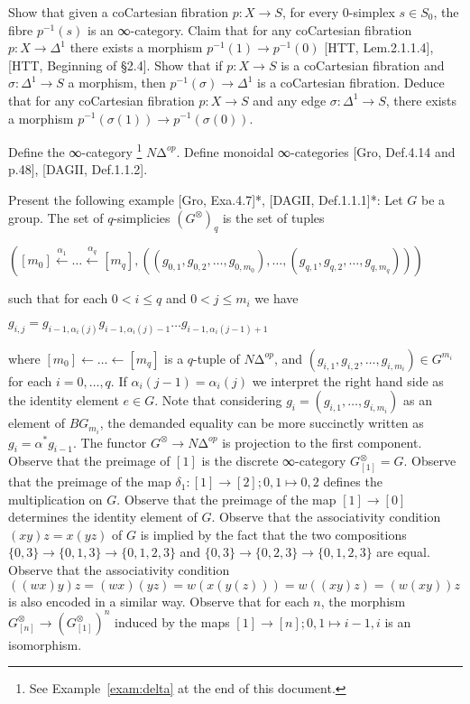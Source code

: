 \documentclass[a4paper]{amsart}
\numberwithin{figure}{section}
\theoremstyle{theorem}
\theoremstyle{definition}
\begin{document}
Show that given a coCartesian fibration $p: X {\to} S$, for every 0-simplex $s \in S_0$, the fibre $p^{-1}(s)$ is an ∞-category. %
Claim that for any coCartesian fibration $p: X {\to} \Delta^1$ there exists a morphism $p^{-1}(1) \to p^{-1}(0)$ [HTT, Lem.2.1.1.4], [HTT, Beginning of §2.4]. %
Show that if $p: X{\to}S$ is a coCartesian fibration and $\sigma: \Delta^1 {\to}S$ a morphism, then $p^{-1}(\sigma) \to \Delta^1$ is a coCartesian fibration. %
Deduce that for any coCartesian fibration $p: X \to S$ and any edge $\sigma: \Delta^1 \to S$, there exists a morphism $p^{-1}(\sigma(1)) \to p^{-1}(\sigma(0))$. %

Define the ∞-category%
\footnote{%
See Example~\ref{exam:delta} at the end of this document.%
} %
 $N∆^{op}$. %
 Define monoidal ∞-categories [Gro, Def.4.14 and p.48], [DAGII, Def.1.1.2]. %

Present the following example [Gro, Exa.4.7]*, [DAGII, Def.1.1.1]*: Let $G$ be a group. 
The set of $q$-simplicies $(G^\otimes)_q$ is the set of tuples 
%
\begin{center}
$([m_0] {\stackrel{\alpha_1}{\leftarrow}} \dots {\stackrel{\alpha_q}{\leftarrow}} [m_q], ((g_{0,1}, g_{0,2}, \dots, g_{0, m_0}), \dots, (g_{q,1}, g_{q,2}, \dots, g_{q, m_q})))$
\end{center}
%
such that for each $0 < i ≤ q$ and $0 < j ≤ m_i$ we have %
\begin{center}
$
g_{i,j} = 
g_{i{-}1,\alpha_i(j)}
g_{i{-}1,\alpha_i(j){-}1}
\dots 
g_{i{-}1,\alpha_i(j{-}1){+}1}$
\end{center} %
where $[m_0] {\leftarrow} \dots {\leftarrow} [m_q]$ is a $q$-tuple of $N∆^{op}$, and $(g_{i,1}, g_{i,2}, \dots, g_{i, m_i}) \in G^{m_i}$ for each $i = 0, \dots, q$. If $\alpha_i(j{-}1) = \alpha_i(j)$ we interpret the right hand side as the identity element $e \in G$. Note that considering $g_i = (g_{i,1}, \dots, g_{i, m_i})$ as an element of $BG_{m_i}$, the demanded equality can be more succinctly written as $g_{i} = \alpha^*g_{i{-}1}$. %
The functor $G^\otimes \to N∆^{op}$ is projection to the first component. %
Observe that the preimage of $[1]$ is the discrete ∞-category $G^\otimes_{[1]} = G$. %
Observe that the preimage of the map $\delta_1: [1] {→} [2]; 0,1 \mapsto 0,2$ defines the multiplication on $G$. %
Observe that the preimage of the map $[1] → [0]$ determines the identity element of $G$. %
Observe that the associativity condition $(xy)z = x(yz)$ of $G$ is implied by the fact that the two compositions $\{0,3\} → \{0,1,3\} → \{0,1,2,3\}$ and $\{0,3\} → \{0,2,3\} → \{0,1,2,3\}$ are equal. %
Observe that the associativity condition $((wx)y)z = (wx)(yz) = w(x(y(z))) = w((xy)z) = (w(xy))z$ is also encoded in a similar way. %
Observe that for each $n$, the morphism $G^\otimes_{[n]} \to (G^\otimes_{[1]})^n$ induced by the maps $[1] {→} [n]; 0,1 \mapsto i{-}1,i$ is an isomorphism. %
\end{document}
